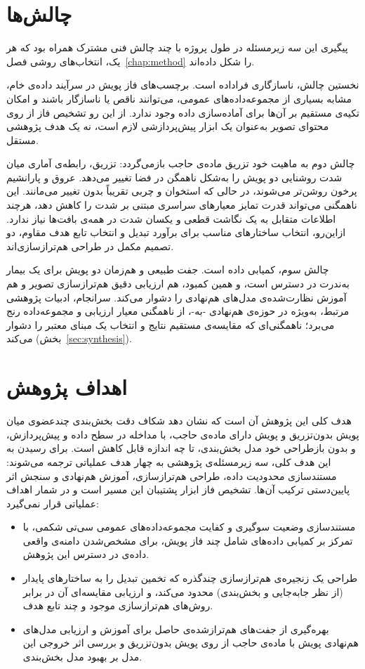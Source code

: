 \section{چالش‌ها}
\label{sec:challenges}

پیگیری این سه زیرمسئله در طول پروژه با چند چالش فنی مشترک همراه بود که هر یک، انتخاب‌های روشی فصل~\ref{chap:method} را شکل داده‌اند.

نخستین چالش، ناسازگاری فراداده است. برچسب‌های فاز پویش در سرآیند  داده‌ی خام، مشابه بسیاری از مجموعه‌داده‌های عمومی، می‌توانند ناقص یا ناسازگار باشند و امکان تکیه‌ی مستقیم بر آن‌ها برای آماده‌سازی داده وجود ندارد. از این رو تشخیص فاز از روی محتوای تصویر به‌عنوان یک ابزار پیش‌پردازشی لازم است، نه یک هدف پژوهشی مستقل.

چالش دوم به ماهیت خود تزریق ماده‌ی حاجب بازمی‌گردد: تزریق، رابطه‌ی آماری میان شدت روشنایی دو پویش را به‌شکل ناهمگن در فضا تغییر می‌دهد. عروق و پارانشیم پرخون روشن‌تر می‌شوند، در حالی که استخوان و چربی تقریباً بدون تغییر می‌مانند. این ناهمگنی می‌تواند قدرت تمایز معیارهای سراسری مبتنی بر شدت را کاهش دهد، هرچند اطلاعات متقابل به یک نگاشت قطعی و یکسان شدت در همه‌ی بافت‌ها نیاز ندارد. ازاین‌رو، انتخاب ساختارهای مناسب برای برآورد تبدیل و انتخاب تابع هدف مقاوم، دو تصمیم مکمل در طراحی هم‌ترازسازی‌اند.

چالش سوم، کمیابی داده است. جفت طبیعی و هم‌زمان دو پویش برای یک بیمار به‌ندرت در دسترس است، و همین کمبود، هم ارزیابی دقیق هم‌ترازسازی تصویر و هم آموزش نظارت‌شده‌ی مدل‌های هم‌نهادی را دشوار می‌کند. سرانجام، ادبیات پژوهشی مرتبط، به‌ویژه در حوزه‌ی هم‌نهادی -به-، از ناهمگنی معیار ارزیابی و مجموعه‌داده رنج می‌برد؛ ناهمگنی‌ای که مقایسه‌ی مستقیم نتایج و انتخاب یک مبنای معتبر را دشوار می‌کند (بخش~\ref{sec:synthesis}).

\section{اهداف پژوهش}
\label{sec:goals}

هدف کلی این پژوهش آن است که نشان دهد شکاف دقت بخش‌بندی چندعضوی میان پویش بدون‌تزریق و پویش دارای ماده‌ی حاجب، با مداخله در سطح داده و پیش‌پردازش، و بدون بازطراحی خود مدل بخش‌بندی، تا چه اندازه قابل کاهش است. برای رسیدن به این هدف کلی، سه زیرمسئله‌ی پژوهشی به چهار هدف عملیاتی ترجمه می‌شوند: مستندسازی محدودیت داده، طراحی هم‌ترازسازی، آموزش هم‌نهادی و سنجش اثر پایین‌دستی ترکیب آن‌ها. تشخیص فاز ابزار پشتیبان این مسیر است و در شمار اهداف عملیاتی قرار نمی‌گیرد:

\begin{itemize}
\item مستندسازی وضعیت سوگیری و کفایت مجموعه‌داده‌های عمومی سی‌تی شکمی، با تمرکز بر کمیابی داده‌‌های شامل چند فاز پویش، برای مشخص‌شدن دامنه‌ی واقعی داده‌ی در دسترس این پژوهش.
\item طراحی یک زنجیره‌ی هم‌ترازسازی چندگذره که تخمین تبدیل را به ساختارهای پایدار (از نظر جابه‌جایی و بخش‌بندی) محدود می‌کند، و ارزیابی مقایسه‌ای آن در برابر روش‌های هم‌ترازسازی موجود و چند تابع هدف.
\item بهره‌گیری از جفت‌های هم‌ترازشده‌ی حاصل برای آموزش و ارزیابی مدل‌های هم‌نهادی پویش با ماده‌ی حاجب از روی پویش بدون‌تزریق و بررسی اثر خروجی این مدل بر بهبود مدل بخش‌بندی.

\end{itemize}


